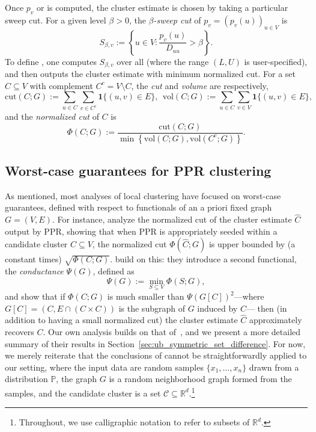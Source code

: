 \documentclass[11pt,twoside]{article}
\newcommand{\Reals}{\mathbb{R}}
\newcommand{\set}[1]{\left\{#1\right\}}
\newcommand{\1}{\mathbf{1}}
\newcommand{\Rd}{\Reals^d}
\newcommand{\mc}[1]{\mathcal{#1}}
\newcommand{\Pbb}{\mathbb{P}}
\newcommand{\wh}[1]{\widehat{#1}}
\newcommand{\vol}{\mathrm{vol}}
\newcommand{\cut}{\mathrm{cut}}
\begin{document}
Once $p_v$ or  is computed, the cluster estimate \smash{$\wh{C}$} is chosen by taking a particular sweep cut. For a given level $\beta > 0$, the \emph{$\beta$-sweep cut} of $p_v = (p_v(u))_{u \in V}$ is 
\begin{equation}
\label{eqn:sweep_cuts}
S_{\beta,v} := \set{u \in V: \frac{p_v(u)}{D_{uu}} > \beta}.
\end{equation}
To define \smash{$\wh{C}$}, one computes $S_{\beta,v}$ over all  (where the range $(L,U)$ is user-specified), and then outputs the cluster estimate \smash{$\wh{C} = S_{\beta^*,v}$} with minimum normalized cut. For a set $C \subseteq V$ with complement $C^c = V \!\setminus\! C$, the \emph{cut} and \emph{volume} are respectively,
\begin{equation}
\label{eqn:cut_volume}
\cut(C;G) := \sum_{u \in C} \sum_{v \in C^c}
\1\{(u,v) \in E\},~~ \vol(C; G) := \sum_{u \in C}  \sum_{v \in V} \1\{(u,v) \in E\},
\end{equation}
and the \emph{normalized cut} of $C$ is
\begin{equation}
\label{eqn:normalized_cut}
\Phi(C; G) := \frac{\cut(C;G)}{\min \set{\vol(C; G), \vol(C^c; G)}}.
\end{equation} 

\subsection{Worst-case guarantees for PPR clustering}
As mentioned, most analyses of local clustering have focused on worst-case guarantees, defined with respect to functionals of an a priori fixed graph $G = (V,E)$.  For instance, \cite{andersen2006} analyze the normalized cut of the cluster estimate $\wh{C}$ output by PPR, showing that when PPR is appropriately seeded within a candidate cluster $C \subseteq V$, the normalized cut $\Phi(\wh{C};G)$ is upper bounded by (a constant times)  $\sqrt{\Phi(C;G)}$. \cite{zhu2013} build on this: they introduce a second functional, the \emph{conductance} $\Psi(G)$, defined as 
\begin{equation}
\label{eqn:conductance}
\Psi(G) := \min_{S \subseteq V} \Phi(S;G),
\end{equation}
and show that if $\Phi(C;G)$ is much smaller than $\Psi(G[C])^2$---where $G[C] = (C,E \cap (C \times C))$ is the subgraph of $G$ induced by $C$--- then (in addition to having a small normalized cut) the cluster estimate $\wh{C}$ approximately recovers $C$. Our own analysis builds on that of~\cite{zhu2013}, and we present a more detailed summary of their results in Section~\ref{sec:ub_symmetric_set_difference}. For now, we merely reiterate that the conclusions of \citet{andersen2006,zhu2013} cannot be straightforwardly applied to our setting, where the input data are random samples $\{x_1,\ldots,x_n\}$ drawn from a distribution $\Pbb$, the graph $G$ is a random neighborhood graph formed from the samples, and the candidate cluster is a set $\mc{C} \subseteq \Rd$.\footnote{Throughout, we use calligraphic notation to refer to subsets of $\Rd$.}
\end{document}
